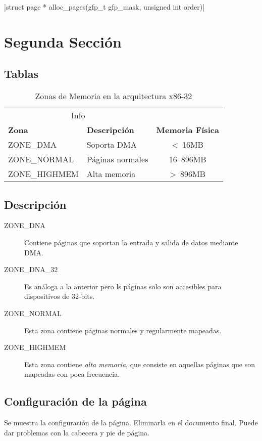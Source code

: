 \documentclass{article}
\begin{document}
		\lipsum[3]
		
		|struct page * alloc_pages(gfp_t gfp_mask, unsigned int order)|
		
		\lipsum[4]



\section{Segunda Sección}

	\subsection{Tablas}

		\lipsum[5]

		\begin{table}[ht]
		\caption{Zonas de Memoria en la arquitectura x86-32}
		\kern 1mm                                  %
		\centering \begin{tabular}{@{}llc@{}}
		\toprule
		\multicolumn{2}{c}{Info}                                            \\
		\cmidrule(r){1-2}
		\textbf{Zona} & \textbf{Descripción}   & \textbf{Memoria Física}    \\ 
		\midrule
		ZONE\_DMA     & Soporta DMA            & \textless \ 16MB           \\ 
		ZONE\_NORMAL  & Páginas normales       & 16–896MB                   \\
		ZONE\_HIGHMEM & Alta memoria           & \textgreater \ 896MB       \\ 
		\bottomrule
		\end{tabular}
		\label{table:memoria-x86-32}
		\end{table}

\subsection{Descripción}

	\begin{description}
		\item[ZONE\_DNA] Contiene páginas que soportan la entrada y salida de datos mediante DMA.
		\item[ZONE\_DNA\_32] Es análoga a la anterior pero ls páginas solo son accesibles para dispositivos de 32-bits.
		\item[ZONE\_NORMAL] Esta zona contiene páginas normales y regularmente mapeadas.
		\item[ZONE\_HIGHMEM] Esta zona contiene \textit{alta memoria}, que consiste en aquellas páginas que son mapeadas con poca frecuencia.
	\end{description}

	\pagebreak

	\subsection{Configuración de la página}

		Se muestra la configuración de la página. Eliminarla en el documento final. Puede dar problemas con la cabecera y pie de página.

		\centering\layout
\end{document}
